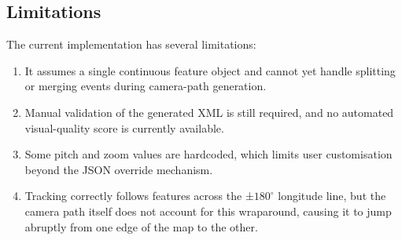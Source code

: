 \documentclass[journal abbreviation, manuscript]{copernicus}
\begin{document}
\subsection{Limitations}

The current implementation has several limitations:
\begin{enumerate}
\item It assumes a single continuous feature object and cannot yet handle splitting or merging events during camera-path generation.
\item Manual validation of the generated XML is still required, and no automated visual-quality score is currently available.
\item Some pitch and zoom values are hardcoded, which limits user customisation beyond the JSON override mechanism. \cite{caban2007texture}
\item Tracking correctly follows features across the ±$180^{\circ}$ longitude line, but the camera path itself does not account for this wraparound, causing it to jump abruptly from one edge of the map to the other.
\end{enumerate}





\end{document}
